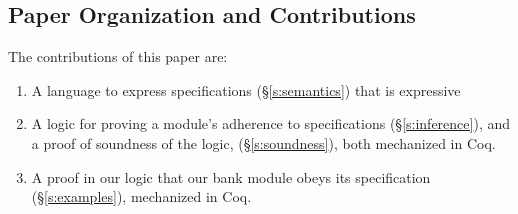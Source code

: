 

\subsection{Paper Organization and Contributions}


%
The contributions of this paper are:\begin{enumerate}
 \item
A language to
express \Nec specifications (\S\ref{s:semantics}) that is  expressive

 \item
A logic for proving a module's adherence to 
 \Nec specifications (\S\ref{s:inference}), and a proof of soundness of the logic, (\S\ref{s:soundness}),
both mechanized in Coq. 
 \item
A proof in our logic %
  that our bank module obeys its \Nec specification (\S\ref{s:examples}),  mechanized in Coq.
\end{enumerate}



